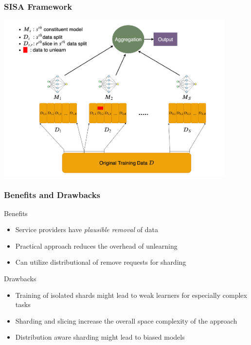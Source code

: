 \documentclass[pdf]{beamer}
\begin{document}
\begin{frame}
  \frametitle{SISA Framework}
  \begin{center}
    \includegraphics[width=0.9\textwidth]{images/SISA.pdf}
  \end{center}
\end{frame}

\begin{frame}
  \frametitle{Benefits and Drawbacks}
  \begin{block}{Benefits}
    \begin{itemize}
      \item Service providers have \textit{plausible removal} of data
      \item Practical approach reduces the overhead of unlearning
      \item Can utilize distributional of remove requests for sharding
    \end{itemize}
  \end{block}
  \begin{alertblock}{Drawbacks}
    \begin{itemize}
      \item Training of isolated shards might lead to weak learners for especially complex tasks
      \item Sharding and slicing increase the overall space complexity of the approach
      \item Distribution aware sharding might lead to biased models 
    \end{itemize}      
  \end{alertblock}
\end{frame}
\end{document}
